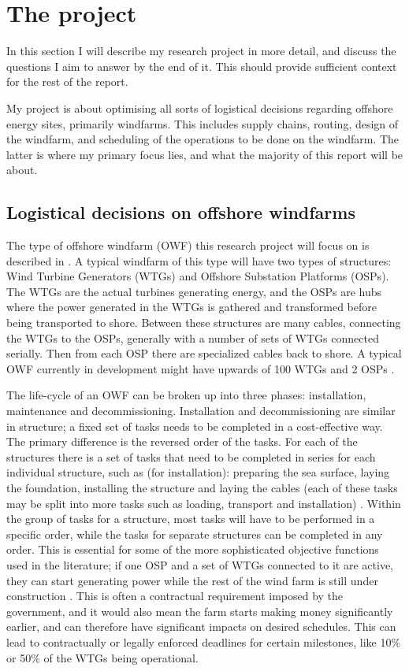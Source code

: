 \documentclass[a4paper,12pt]{article}
\begin{document}
\section{The project} \label{s:project}
In this section I will describe my research project in more detail, and discuss the questions I aim to answer by the end of it. This should provide sufficient context for the rest of the report. 

My project is about optimising all sorts of logistical decisions regarding offshore energy sites, primarily windfarms. This includes supply chains, routing, design of the windfarm, and scheduling of the operations to be done on the windfarm. The latter is where my primary focus lies, and what the majority of this report will be about. 

\subsection{Logistical decisions on offshore windfarms} \label{ss:logdec}
The type of offshore windfarm (OWF) this research project will focus on is described in \cite{barlow2018mixed}. A typical windfarm of this type will have two types of structures: Wind Turbine Generators (WTGs) and Offshore Substation Platforms (OSPs). The WTGs are the actual turbines generating energy, and the OSPs are hubs where the power generated in the WTGs is gathered and transformed before being transported to shore. Between these structures are many cables, connecting the WTGs to the OSPs, generally with a number of sets of WTGs connected serially. Then from each OSP there are specialized cables back to shore. A typical OWF currently in development might have upwards of 100 WTGs and 2 OSPs \cite{ruk2017}. 

The life-cycle of an OWF can be broken up into three phases: installation, maintenance and decommissioning. Installation and decommissioning are similar in structure; a fixed set of tasks needs to be completed in a cost-effective way. The primary difference is the reversed order of the tasks. For each of the structures there is a set of tasks that need to be completed in series for each individual structure, such as (for installation): preparing the sea surface, laying the foundation, installing the structure and laying the cables (each of these tasks may be split into more tasks such as loading, transport and installation) \cite{kerkhove2017optimised}. Within the group of tasks for a structure, most tasks will have to be performed in a specific order, while the tasks for separate structures can be completed in any order. This is essential for some of the more sophisticated objective functions used in the literature; if one OSP and a set of WTGs connected to it are active, they can start generating power while the rest of the wind farm is still under construction \cite{barlow2017using}. This is often a contractual requirement imposed by the government, and it would also mean the farm starts making money significantly earlier, and can therefore have significant impacts on desired schedules. This can lead to contractually or legally enforced deadlines for certain milestones, like 10\% or 50\% of the WTGs being operational.
\end{document}
